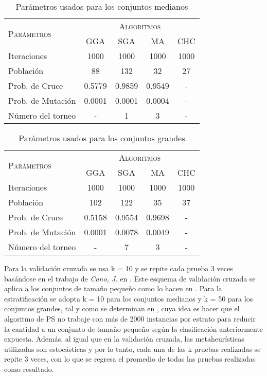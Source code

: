 \begin{table}[]
\centering
\begin{tabular}{l c c c c}
\hline
\multirow{2}{*}{\textsc{Parámetros}}
	& \multicolumn{4}{c}{\textsc{Algoritmos}} \\
	& GGA & SGA & MA & CHC \\
\hline
\hline
Iteraciones             &  1000    &  1000    &  1000      &  1000 \\
Población               &    88    &    132   &    32      &    27 \\
Prob. de Cruce          &   0.5779 &   0.9859 &     0.9549 &     - \\
Prob. de Mutación       &   0.0001 &  0.0001  &     0.0004 &     - \\
Número del torneo       &   -      &    1     &     3      &     - \\
\hline
\end{tabular}
\caption{Parámetros usados para los conjuntos medianos}
\label{param-med}
\end{table}

\begin{table}[]
\centering
\begin{tabular}{l c c c c}
\hline
\multirow{2}{*}{\textsc{Parámetros}}
	& \multicolumn{4}{c}{\textsc{Algoritmos}} \\
	& GGA & SGA & MA & CHC \\
\hline
\hline
Iteraciones             &  1000    &  1000    &  1000      &  1000 \\
Población               &    102   &    122   &    35      &    37 \\
Prob. de Cruce          &   0.5158 &   0.9554 &     0.9698 &     - \\
Prob. de Mutación       &   0.0001 &  0.0078  &     0.0049 &     - \\
Número del torneo       &   -      &    7     &     3      &     - \\
\hline
\end{tabular}
\caption{Parámetros usados para los conjuntos grandes}
\label{param-grande}
\end{table}

Para la validación cruzada se usa k = 10 y se repite cada prueba 3 veces basándose en el trabajo de \emph{Cano, J.} en \cite{de2004reduccion}. Este esquema de validación cruzada se aplica a los conjuntos de tamaño pequeño como lo hacen en \cite{de2004reduccion}. Para la estratificación se adopta k = 10 para los conjuntos medianos y k = 50 para los conjuntos grandes, tal y como se determinan en \cite{cano2005stratification}, cuya idea es hacer que el algoritmo de PS no trabaje con más de 2000 instancias por estrato para reducir la cantidad a un conjunto de tamaño pequeño según la clasificación anteriormente expuesta. Además, al igual que en la validación cruzada, las metaheurísticas utilizadas son estocásticas y por lo tanto, cada una de las k pruebas realizadas se repite 3 veces, con lo que se regresa el promedio de todas las pruebas realizadas como resultado.

